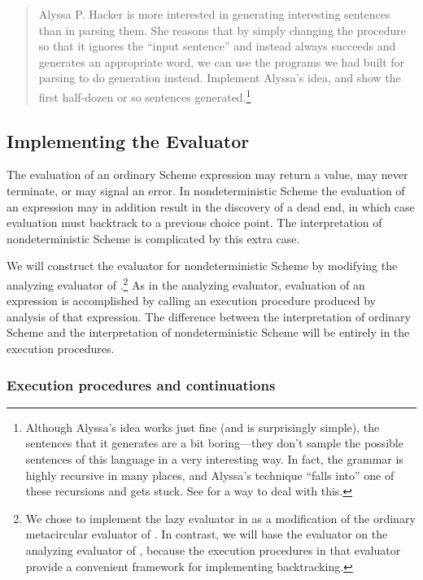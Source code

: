 \begin{quote}
 Alyssa P. Hacker is more
interested in generating interesting sentences than in parsing them.  She
reasons that by simply changing the procedure  so that it
ignores the ``input sentence'' and instead always succeeds and generates an
appropriate word, we can use the programs we had built for parsing to do
generation instead.  Implement Alyssa's idea, and show the first half-dozen or
so sentences generated.\footnote{Although Alyssa's idea works just fine (and is
surprisingly simple), the sentences that it generates are a bit boring---they
don't sample the possible sentences of this language in a very interesting way.
In fact, the grammar is highly recursive in many places, and Alyssa's technique
``falls into'' one of these recursions and gets stuck.  See 
for a way to deal with this.}
\end{quote}

\subsection{Implementing the  Evaluator}
\label{Section 4.3.3}

The evaluation of an ordinary Scheme expression may return a value, may never
terminate, or may signal an error.  In nondeterministic Scheme the evaluation
of an expression may in addition result in the discovery of a dead end, in
which case evaluation must backtrack to a previous choice point.  The
interpretation of nondeterministic Scheme is complicated by this extra case.

We will construct the  evaluator for nondeterministic Scheme by
modifying the analyzing evaluator of .\footnote{We chose to
implement the lazy evaluator in  as a modification of the
ordinary metacircular evaluator of .  In contrast, we will
base the  evaluator on the analyzing evaluator of
, because the execution procedures in that evaluator provide a
convenient framework for implementing backtracking.}  As in the analyzing
evaluator, evaluation of an expression is accomplished by calling an execution
procedure produced by analysis of that expression.  The difference between the
interpretation of ordinary Scheme and the interpretation of nondeterministic
Scheme will be entirely in the execution procedures.

\subsubsection*{Execution procedures and continuations}

